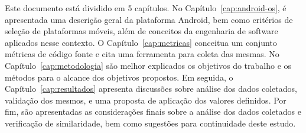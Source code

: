Este documento está dividido em 5 capítulos. No Capítulo~\ref{cap:android-os}, é apresentada uma descrição geral da plataforma Android, bem como critérios de seleção de plataformas móveis, além de conceitos da engenharia de software aplicados nesse contexto. O Capítulo~\ref{cap:metricas} conceitua um conjunto métricas de código fonte e cita uma ferramenta para coleta das mesmas. No Capítulo~\ref{cap:metodologia} são melhor explicados os objetivos do trabalho e os métodos para o alcance dos objetivos propostos. Em seguida, o Capítulo~\ref{cap:resultados} apresenta discussões sobre análise dos dados coletados, validação dos mesmos, e uma proposta de aplicação dos valores definidos. Por fim, são apresentadas as considerações finais sobre a análise dos dados coletados e verificação de similaridade, bem como sugestões para continuidade deste estudo.
